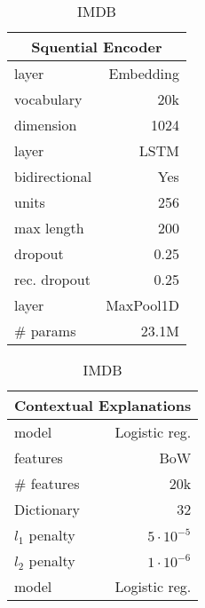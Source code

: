 \documentclass[twoside,11pt]{article}
\begin{document}
\begin{table}[t!]
\begin{subtable}[t]{.49\textwidth}
\caption{\small IMDB}
\scriptsize
\def\arraystretch{1.2}
\setlength\tabcolsep{2pt}
\begin{tabular}[t]{@{}l|r@{}}
    \toprule
    \multicolumn{2}{c}{\textbf{Squential Encoder}}              \\
    \midrule
    layer                           & Embedding                 \\
    vocabulary                      & 20k                       \\
    dimension                       & 1024                      \\
    \midrule
    layer                           & LSTM                      \\
    bidirectional                   & Yes                       \\
    units                           & 256                       \\
    max length                      & 200                       \\
    dropout                         & 0.25                      \\
    rec. dropout                    & 0.25                      \\
    \midrule
    layer                           & MaxPool1D                 \\
    \midrule
    \# params                       & 23.1M                     \\
    \bottomrule
\end{tabular}\hspace{2pt}\setlength\tabcolsep{2pt}
\begin{tabular}[t]{@{}l|r@{}}
    \toprule
    \multicolumn{2}{c}{\textbf{Contextual Explanations}}        \\
    \midrule
    model                               & Logistic reg.         \\
    features                            & BoW                   \\
    \# features                         & 20k                   \\
    Dictionary                          & 32                    \\
    $l_1$ penalty                       & $5 \cdot 10^{-5}$     \\
    $l_2$ penalty                       & $1 \cdot 10^{-6}$     \\
    \midrule
    model                               & Logistic reg.         \\

\end{tabular}
\end{subtable}
\end{table}
\end{document}
